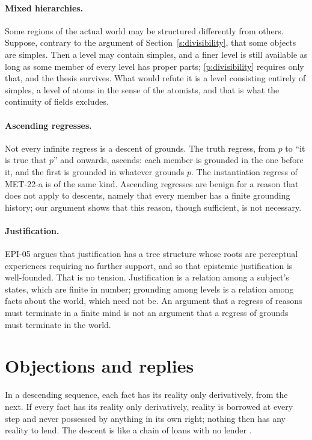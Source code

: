 \documentclass{situationist-preprint}
\begin{document}
\paragraph{Mixed hierarchies.} Some regions of the actual world may be structured differently from others. Suppose, contrary to the argument of Section~\ref{s:divisibility}, that some objects are simples. Then a level may contain simples, and a finer level is still available as long as some member of every level has proper parts; \ref{p:divisibility} requires only that, and the thesis survives. What would refute it is a level consisting entirely of simples, a level of atoms in the sense of the atomists, and that is what the continuity of fields excludes.

\paragraph{Ascending regresses.} Not every infinite regress is a descent of grounds. The truth regress, from $p$ to \enquote{it is true that $p$} and onwards, ascends: each member is grounded in the one before it, and the first is grounded in whatever grounds $p$. The instantiation regress of MET-22-a is of the same kind. Ascending regresses are benign for a reason that does not apply to descents, namely that every member has a finite grounding history; our argument shows that this reason, though sufficient, is not necessary.

\paragraph{Justification.} EPI-05 argues that justification has a tree structure whose roots are perceptual experiences requiring no further support, and so that epistemic justification is well-founded. That is no tension. Justification is a relation among a subject's states, which are finite in number; grounding among levels is a relation among facts about the world, which need not be. An argument that a regress of reasons must terminate in a finite mind is not an argument that a regress of grounds must terminate in the world.

\section{Objections and replies}\label{s:objections}

\begin{objection}\label{o:borrowed}
In a descending sequence, each fact has its reality only derivatively, from the next. If every fact has its reality only derivatively, reality is borrowed at every step and never possessed by anything in its own right; nothing then has any reality to lend. The descent is like a chain of loans with no lender \citep[cf.][]{Schaffer2010}.
\end{objection}
\end{document}
